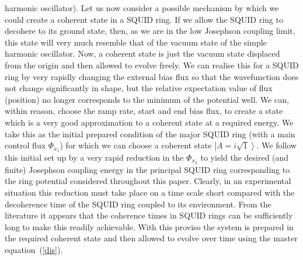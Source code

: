 \documentclass[12pt,a4paper,superscriptaddress,showpacs,floatfix,pra]{revtex4-2}
\begin{document}
harmonic  oscillator). Let  us now  consider a  possible  mechanism by
which we  could create a coherent state  in a SQUID ring.  If we allow
the SQUID ring to decohere to its ground state, then, as we are in the
low Josephson coupling limit, this  state will very much resemble that
of  the  vacuum state  of  the  simple  harmonic oscillator.   Now,  a
coherent state is just the  vacuum state displaced from the origin and
then allowed to evolve freely. We can realise this for a SQUID ring by
very rapidly changing the external  bias flux so that the wavefunction
does not  change significantly in shape, but  the relative expectation
value of flux  (position) no longer corresponds to  the minimum of the
potential well. We can, within reason, choose the ramp rate, start and
end bias flux, to create a state which is a very good approximation to
a coherent  state at a  required energy. We  take this as  the initial
prepared condition of the major  SQUID ring {(with a main control flux
$\Phi _{x_{1}}$)} for which we can choose a coherent state $\left\vert
A=i\sqrt{1}\right\rangle $. We follow this  {initial set up} by a very
rapid reduction  in the  {$\Phi _{x_{2}}$} to  yield the  desired (and
finite)  Josephson  coupling  energy   in  the  principal  SQUID  ring
corresponding to the ring  potential considered throughout this paper.
Clearly, in  an experimental situation this reduction  must take place
on a time scale short compared  with the decoherence time of the SQUID
ring    coupled   to    its   environment.    From    the   literature
\cite{Martinis2002,Zhou2002,Han2001,Mooij2003}  it  appears  that  the
coherence times in  SQUID rings can be sufficiently  long to make this
readily achievable. With this proviso the  system is prepared
in the  required coherent state and  then allowed to  evolve over time
using the master equation~(\ref{dis}).
\end{document}

